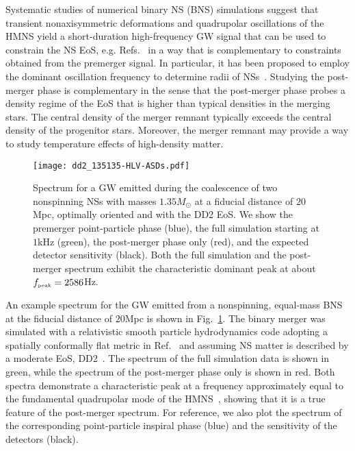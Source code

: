 \documentclass[aps,prd,amsmath,floats,floatfix, twocolumn,
superscriptaddress,nofootinbib,showpacs]{revtex4-1}
\newcommand{\peak}{{\mbox{\tiny peak}}}
\begin{document}
Systematic studies of numerical binary NS (BNS) simulations suggest that transient nonaxisymmetric deformations and quadrupolar oscillations of the HMNS yield a short-duration high-frequency GW signal that can be used to constrain the NS EoS, e.g. Refs.~\cite{1994PhRvD..50.6247Z,1996A&A...311..532R,2005PhRvL..94t1101S,2005PhRvD..71h4021S,shibata:06bns,2007PhRvL..99l1102O,2011MNRAS.418..427S,2011PhRvD..83l4008H,2012PhRvL.108a1101B,bauswein:12,2013PhRvL.111m1101B,PhysRevD.78.084033,2011PhRvL.107e1102S,hotokezaka:13,2014PhRvL.113i1104T,2014arXiv1412.3240T,2015arXiv150401764B,bauswein:15,Foucart2016,Lehner:2016lxy,Kawamura2016,2016CQGra..33x4004E,Radice:2016rys,Dietrich2017,Maione2017} in a way that is complementary to constraints obtained from the premerger signal. In particular, it has been proposed to employ the dominant oscillation frequency to determine radii of NSs~\cite{2012PhRvL.108a1101B,bauswein:12}. Studying the post-merger phase is complementary in the sense that the post-merger phase probes a density regime of the EoS that is higher than typical densities in the merging stars. The central density of the merger remnant typically exceeds the central density of the progenitor stars. Moreover, the merger remnant may provide a way to study temperature effects of high-density matter.


\begin{figure}[h!]
\texttt{[image: dd2\_135135-HLV-ASDs.pdf]}
\caption{ \label{fig:examplewaveform} Spectrum for a GW emitted during the coalescence of two nonspinning NSs with masses $1.35M_{\odot}$ at a fiducial distance of $20$Mpc, optimally oriented and with the DD2 EoS. We show the premerger point-particle phase (blue), the full simulation starting at $1$kHz (green), the post-merger phase only (red), and the expected detector sensitivity (black). Both the full simulation and the post-merger spectrum exhibit the characteristic dominant peak at about $f_{\peak}=2586$Hz.}
\end{figure}

An example spectrum for the GW emitted from a nonspinning, equal-mass BNS at the fiducial distance of $20$Mpc is shown in Fig.~\ref{fig:examplewaveform}. The binary merger was simulated with a relativistic smooth particle hydrodynamics code adopting a spatially conformally flat metric in Ref.~\cite{bauswein:14} and assuming NS matter is described by a moderate EoS, DD2~\cite{2010NuPhA.837..210H,2010PhRvC..81a5803T}. The spectrum of the full simulation data is shown in green, while the spectrum of the post-merger phase only is shown in red. Both spectra demonstrate a characteristic peak at a frequency approximately equal to the fundamental quadrupolar mode of the HMNS~\cite{2011MNRAS.418..427S,bauswein:july15}, showing that it is a true feature of the post-merger spectrum. For reference, we also plot the spectrum of the corresponding point-particle inspiral phase  (blue) and the sensitivity of the detectors (black).
\end{document}
